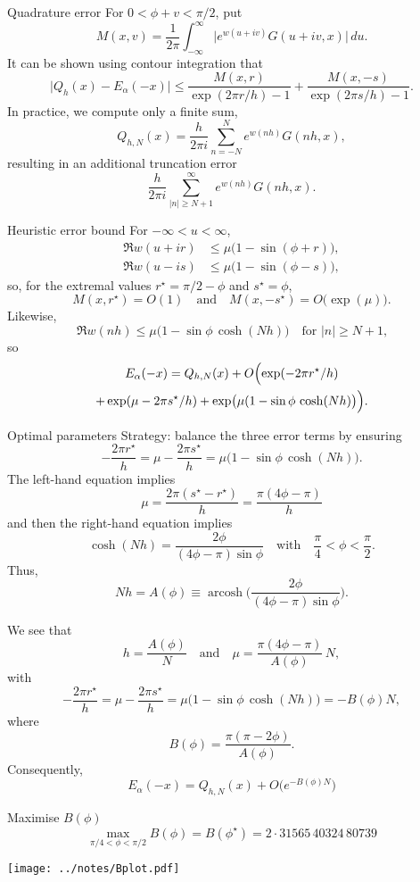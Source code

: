 \documentclass{beamer}
\begin{document}
\begin{frame}{Quadrature error}
For $0<\phi+v<\pi/2$, put
\[
M(x,v)=\frac{1}{2\pi}\int_{-\infty}^\infty\bigl|e^{w(u+iv)}G(u+iv,x)\bigr|\,du.
\]
It can be shown using contour integration that
\[
\bigl|Q_h(x)-E_\alpha(-x)\bigr|\le\frac{M(x,r)}{\exp(2\pi r/h)-1}
	+\frac{M(x,-s)}{\exp(2\pi s/h)-1}.
\]
In practice, we compute only a finite sum,
\[
Q_{h,N}(x)=\frac{h}{2\pi i}\sum_{n=-N}^N e^{w(nh)}G(nh,x),
\]
resulting in an additional truncation error
\[
\frac{h}{2\pi i}\sum_{|n|\ge N+1}^\infty e^{w(nh)}G(nh,x).
\]
\end{frame}
\begin{frame}{Heuristic error bound}
For $-\infty<u<\infty$,
\begin{align*}
\Re w(u+ir)&\le\mu\bigl(1-\sin(\phi+r)\bigr),\\
\Re w(u-is)&\le\mu\bigl(1-\sin(\phi-s)\bigr),
\end{align*}
so, for the extremal values $r^\star=\pi/2-\phi$ and $s^\star=\phi$, 
\[
M(x,r^\star)=O(1)\quad\text{and}\quad M(x,-s^\star)=O\bigl(\exp(\mu)\bigr).
\]
Likewise,
\[
\Re w(nh)\le\mu\bigl(1-\sin\phi\,\cosh(Nh)\bigr)
\quad\text{for $|n|\ge N+1$,}
\]
so
\begin{multline*}
E_\alpha(-x)=Q_{h,N}(x)+O\Bigl(\exp(-2\pi r^\star/h)\\
	+\exp(\mu-2\pi s^\star/h)
	+\exp\bigl(\mu(1-\sin\phi\,\cosh(Nh)\bigr)\Bigr).
\end{multline*}
\end{frame}
\begin{frame}{Optimal parameters}
Strategy: balance the three error terms by ensuring
\[
-\frac{2\pi r^\star}{h}=\mu-\frac{2\pi s^\star}{h}
	=\mu\bigl(1-\sin\phi\,\cosh(Nh)\bigr).
\]
The left-hand equation implies
\[
\mu=\frac{2\pi(s^\star-r^\star)}{h}=\frac{\pi(4\phi-\pi)}{h}
\]
and then the right-hand equation implies
\[
\cosh(Nh)=\frac{2\phi}{(4\phi-\pi)\sin\phi}
\quad\text{with}\quad\frac{\pi}{4}<\phi<\frac{\pi}{2}.
\]
Thus,
\[
Nh=A(\phi)\equiv\operatorname{arcosh}\biggl(
	\frac{2\phi}{(4\phi-\pi)\sin\phi}\biggr).
\]
\end{frame}
\begin{frame}
We see that
\[
h=\frac{A(\phi)}{N}\quad\text{and}\quad
\mu=\frac{\pi(4\phi-\pi)}{A(\phi)}\,N,
\]
with
\[
-\frac{2\pi r^\star}{h}=\mu-\frac{2\pi s^\star}{h}
	=\mu\bigl(1-\sin\phi\,\cosh(Nh)\bigr)=-B(\phi)N,
\]
where
\[
B(\phi)=\frac{\pi(\pi-2\phi)}{A(\phi)}.
\]
Consequently,
\[
E_\alpha(-x)=Q_{h,N}(x)+O\bigl(e^{-B(\phi)N}\bigr)
\]
\end{frame}
\begin{frame}{Maximise $B(\phi)$}
\[
\max_{\pi/4<\phi<\pi/2}B(\phi)=B(\phi^\star)=2{\cdot}31565\,40324\,80739
\]
\vfill
\begin{center}
\texttt{[image: ../notes/Bplot.pdf]}
\end{center}
\end{frame}
\end{document}
